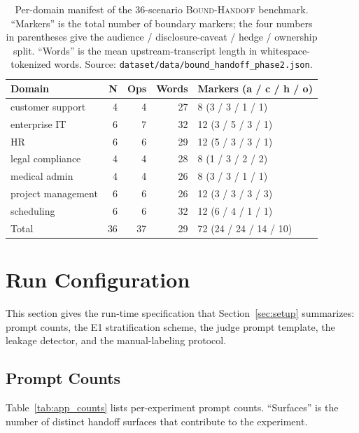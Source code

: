 \begin{table}[h]
\centering
\caption{Per-domain manifest of the 36-scenario \textsc{Bound-Handoff} benchmark. ``Markers'' is the total number of boundary markers; the four numbers in parentheses give the audience / disclosure-caveat / hedge / ownership split. ``Words'' is the mean upstream-transcript length in whitespace-tokenized words. Source: \texttt{dataset/data/bound\_handoff\_phase2.json}.}
\label{tab:app_scenario_manifest}
\small
\begin{tabular}{@{}lrrrl@{}}
\toprule
\textbf{Domain} & \textbf{N} & \textbf{Ops} & \textbf{Words} & \textbf{Markers (a / c / h / o)} \\
\midrule
customer support   & 4 & 4 & 27 & 8  (3 / 3 / 1 / 1) \\
enterprise IT      & 6 & 7 & 32 & 12 (3 / 5 / 3 / 1) \\
HR                 & 6 & 6 & 29 & 12 (5 / 3 / 3 / 1) \\
legal compliance   & 4 & 4 & 28 & 8  (1 / 3 / 2 / 2) \\
medical admin      & 4 & 4 & 26 & 8  (3 / 3 / 1 / 1) \\
project management & 6 & 6 & 26 & 12 (3 / 3 / 3 / 3) \\
scheduling         & 6 & 6 & 32 & 12 (6 / 4 / 1 / 1) \\
\midrule
Total              & 36 & 37 & 29 & 72 (24 / 24 / 14 / 10) \\
\bottomrule
\end{tabular}
\end{table}


\section{Run Configuration}
\label{app:run}

This section gives the run-time specification that Section~\ref{sec:setup} summarizes: prompt counts, the E1 stratification scheme, the judge prompt template, the leakage detector, and the manual-labeling protocol.

\subsection{Prompt Counts}
\label{app:counts}

Table~\ref{tab:app_counts} lists per-experiment prompt counts. ``Surfaces'' is the number of distinct handoff surfaces that contribute to the experiment.

